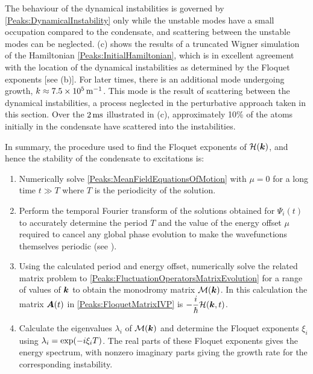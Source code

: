 The behaviour of the dynamical instabilities is governed by \eqref{Peaks:DynamicalInstability} only while the unstable modes have a small occupation compared to the condensate, and scattering between the unstable modes can be neglected. (c) shows the results of a truncated Wigner simulation of the Hamiltonian \eqref{Peaks:InitialHamiltonian}, which is in excellent agreement with the location of the dynamical instabilities as determined by the Floquet exponents [see (b)]. For later times, there is an additional mode undergoing growth, $k \approx \unit[7.5\times 10^5]{m}^{-1}$. This mode is the result of scattering between the dynamical instabilities, a process neglected in the perturbative approach taken in this section.  Over the $\unit[2]{ms}$ illustrated in (c), approximately 10\% of the atoms initially in the condensate have scattered into the instabilities.

\parasep

In summary, the procedure used to find the Floquet exponents of $\mathcal{H}(\bm{k})$, and hence the stability of the condensate to excitations is:
\begin{enumerate}
    \item Numerically solve \eqref{Peaks:MeanFieldEquationsOfMotion} with $\mu=0$ for a long time $t \gg T$ where $T$ is the periodicity of the solution.
    \item Perform the temporal Fourier transform of the solutions obtained for $\Psi_i(t)$ to accurately determine the period $T$ and the value of the energy offset $\mu$ required to cancel any global phase evolution to make the wavefunctions themselves periodic (see ).
    \item Using the calculated period and energy offset, numerically solve the related matrix problem to \eqref{Peaks:FluctuationOperatorsMatrixEvolution} for a range of values of $\bm{k}$ to obtain the monodromy matrix $\mathcal{M}(\bm{k})$. In this calculation the matrix $\bm{A}(t)$ in \eqref{Peaks:FloquetMatrixIVP} is $\displaystyle -\frac{i}{\hbar}\mathcal{H}(\bm{k}, t)$.
    \item Calculate the eigenvalues $\lambda_i$ of $\mathcal{M}(\bm{k})$ and determine the Floquet exponents $\xi_i$ using $\protect{\lambda_i = \exp(-i \xi_i T)}$. The real parts of these Floquet exponents gives the energy spectrum, with nonzero imaginary parts giving the growth rate for the corresponding instability.
\end{enumerate}

